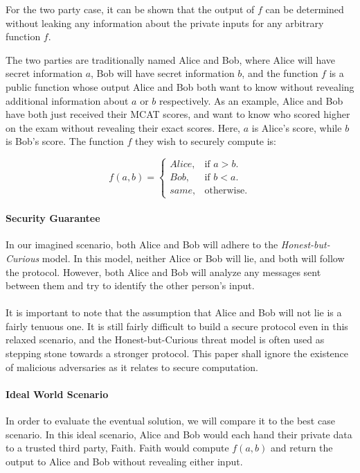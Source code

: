 For the two party case, it can be shown that the output of $f$ can be determined without leaking any information about the private inputs for any arbitrary function $f$.

The two parties are traditionally named Alice and Bob, where Alice will have secret information $a$, Bob will have secret information $b$, and the function $f$ is a public function whose output Alice and Bob both want to know without revealing additional information about $a$ or $b$ respectively. As an example, Alice and Bob have both just received their MCAT scores, and want to know who scored higher on the exam without revealing their exact scores. Here, $a$ is Alice's score, while $b$ is Bob's score. The function $f$ they wish to securely compute is:  

\begin{equation}
f(a,b)= \begin{cases}
Alice, & \text{if $a > b$}.\\
Bob, & \text{if $b < a$}.\\
same, & \text{otherwise}.
\end{cases}
\end{equation}

\paragraph{Security Guarantee}
In our imagined scenario, both Alice and Bob will adhere to the \textit{Honest-but-Curious} model. In this model, neither Alice or Bob will lie, and both will follow the protocol. However, both Alice and Bob will analyze any messages sent between them and try to identify the other person's input.

\paragraph{}
It is important to note that the assumption that Alice and Bob will not lie is a fairly tenuous one. It is still fairly difficult to build a secure protocol even in this relaxed scenario, and the Honest-but-Curious threat model is often used as stepping stone towards a stronger protocol. This paper shall ignore the existence of malicious adversaries as it relates to secure computation.

\paragraph{Ideal World Scenario}
In order to evaluate the eventual solution, we will compare it to the best case scenario. In this ideal scenario, Alice and Bob would each hand their private data to a trusted third party, Faith. Faith would compute $f(a,b)$ and return the output to Alice and Bob without revealing either input.

